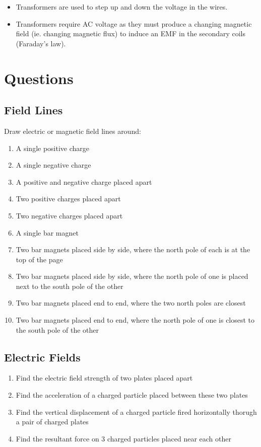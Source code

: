 \documentclass[a4paper,11pt]{article}
\begin{document}
\begin{itemize}
\item Transformers are used to step up and down the voltage in the wires.
\item Transformers require AC voltage as they must produce a changing magnetic
	field (ie. changing magnetic flux) to induce an EMF in the secondary coils
	(Faraday's law).
\end{itemize}




\section{Questions}

\subsection{Field Lines}

Draw electric or magnetic field lines around:

\begin{enumerate}
\item A single positive charge
\item A single negative charge
\item A positive and negative charge placed apart
\item Two positive charges placed apart
\item Two negative charges placed apart
\item A single bar magnet
\item Two bar magnets placed side by side, where the north pole of each is at
	the top of the page
\item Two bar magnets placed side by side, where the north pole of one is placed
	next to the south pole of the other
\item Two bar magnets placed end to end, where the two north poles are closest
\item Two bar magnets placed end to end, where the north pole of one is closest
	to the south pole of the other
\end{enumerate}


\subsection{Electric Fields}

\begin{enumerate}
\item Find the electric field strength of two plates placed apart
\item Find the acceleration of a charged particle placed between these two
	plates
\item Find the vertical displacement of a charged particle fired horizontally
	thorugh a pair of charged plates
\item Find the resultant force on 3 charged particles placed near each other
\end{enumerate}
\end{document}
